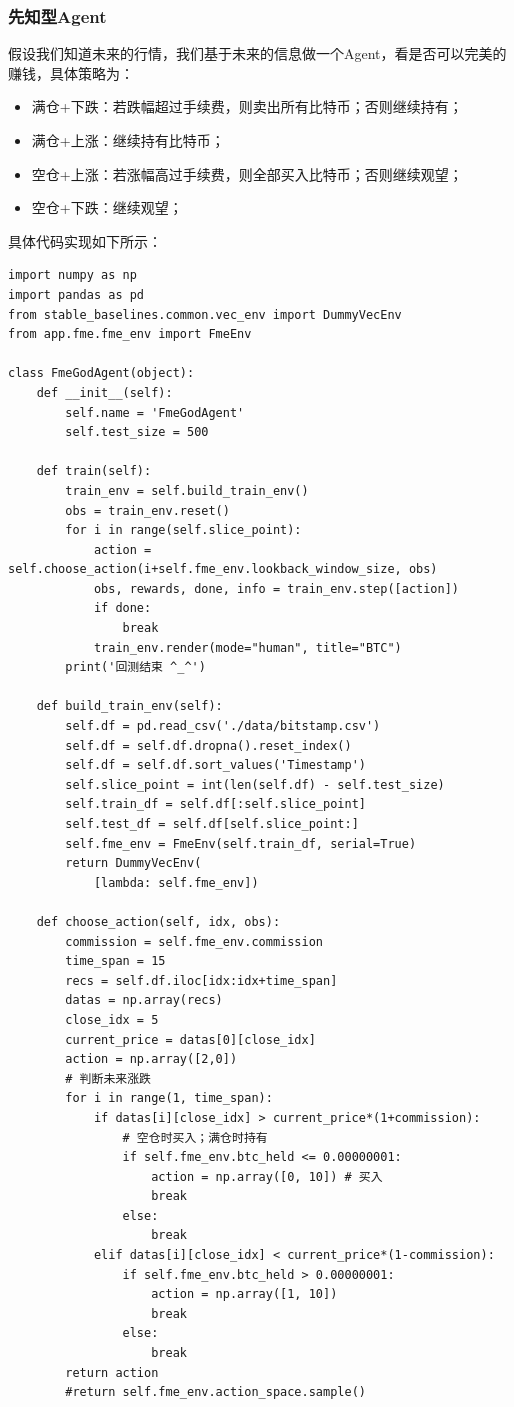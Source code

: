 \documentclass{article}
\begin{document}
\subsubsection{先知型Agent}
假设我们知道未来的行情，我们基于未来的信息做一个Agent，看是否可以完美的赚钱，具体策略为：
\begin{itemize}
\item 满仓+下跌：若跌幅超过手续费，则卖出所有比特币；否则继续持有；
\item 满仓+上涨：继续持有比特币；
\item 空仓+上涨：若涨幅高过手续费，则全部买入比特币；否则继续观望；
\item 空仓+下跌：继续观望；
\end{itemize}
具体代码实现如下所示：
\begin{lstlisting}
import numpy as np
import pandas as pd
from stable_baselines.common.vec_env import DummyVecEnv
from app.fme.fme_env import FmeEnv

class FmeGodAgent(object):
    def __init__(self):
        self.name = 'FmeGodAgent'
        self.test_size = 500

    def train(self):
        train_env = self.build_train_env()
        obs = train_env.reset()
        for i in range(self.slice_point):
            action = self.choose_action(i+self.fme_env.lookback_window_size, obs)
            obs, rewards, done, info = train_env.step([action])
            if done:
                break
            train_env.render(mode="human", title="BTC")
        print('回测结束 ^_^')

    def build_train_env(self):
        self.df = pd.read_csv('./data/bitstamp.csv')
        self.df = self.df.dropna().reset_index()
        self.df = self.df.sort_values('Timestamp')
        self.slice_point = int(len(self.df) - self.test_size)
        self.train_df = self.df[:self.slice_point]
        self.test_df = self.df[self.slice_point:]
        self.fme_env = FmeEnv(self.train_df, serial=True)
        return DummyVecEnv(
            [lambda: self.fme_env])

    def choose_action(self, idx, obs):
        commission = self.fme_env.commission
        time_span = 15
        recs = self.df.iloc[idx:idx+time_span]
        datas = np.array(recs)
        close_idx = 5
        current_price = datas[0][close_idx]
        action = np.array([2,0])
        # 判断未来涨跌
        for i in range(1, time_span):
            if datas[i][close_idx] > current_price*(1+commission):
                # 空仓时买入；满仓时持有
                if self.fme_env.btc_held <= 0.00000001:
                    action = np.array([0, 10]) # 买入
                    break
                else:
                    break
            elif datas[i][close_idx] < current_price*(1-commission):
                if self.fme_env.btc_held > 0.00000001:
                    action = np.array([1, 10])
                    break
                else:
                    break
        return action
        #return self.fme_env.action_space.sample()


\end{lstlisting}
\end{document}
